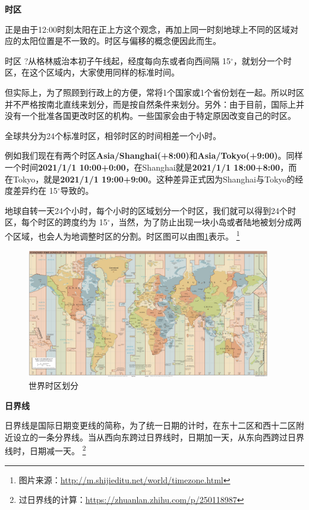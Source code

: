 \documentclass[cn,10pt,math=newtx,citestyle=gb7714-2015,bibstyle=gb7714-2015]{elegantbook}
\def\degree{${}^{\circ}$}
\begin{document}
    \textbf{时区}

    正是由于12:00时刻太阳在正上方这个观念，再加上同一时刻地球上不同的区域对应的太阳位置是不一致的。时区与偏移的概念便因此而生。

    \begin{definition}{时区}
        ?从格林威治本初子午线起，经度每向东或者向西间隔 15\degree ，就划分一个时区，在这个区域内，大家使用同样的标准时间。

        但实际上，为了照顾到行政上的方便，常将1个国家或1个省份划在一起。所以时区并不严格按南北直线来划分，而是按自然条件来划分。另外：由于目前，国际上并没有一个批准各国更改时区的机构。一些国家会由于特定原因改变自己的时区。

        全球共分为24个标准时区，相邻时区的时间相差一个小时。
    \end{definition}

    例如我们现在有两个时区\textbf{Asia/Shanghai(+8:00)}和\textbf{Asia/Tokyo(+9:00)}。同样一个时间\textbf{2021/1/1 10:00+0:00}，在Shanghai就是\textbf{2021/1/1 18:00+8:00}，而在Tokyo，就是\textbf{2021/1/1 19:00+9:00}。这种差异正式因为Shanghai与Tokyo的经度差异约在 15\degree 导致的。

    地球自转一天24个小时，每个小时的区域划分一个时区，我们就可以得到24个时区，每个时区的跨度约为 15\degree ，当然，为了防止出现一块小岛或者陆地被划分成两个区域，也会人为地调整时区的分割。时区图可以由图\ref{std_time_zone}表示。
    \footnote{
        图片来源：\url{http://m.shijieditu.net/world/timezone.html}
    }

    \begin{figure}[H]
        \centering
        \includegraphics[width=0.95\textwidth]{images/std_time_zone.jpg}
        \caption{世界时区划分}
        \label{std_time_zone}
    \end{figure}

    \textbf{日界线}

    日界线是国际日期变更线的简称，为了统一日期的计时，在东十二区和西十二区附近设立的一条分界线。当从西向东跨过日界线时，日期加一天，从东向西跨过日界线时，日期减一天。
    \footnote{
        过日界线的计算：\url{https://zhuanlan.zhihu.com/p/250118987}
    }
\end{document}
